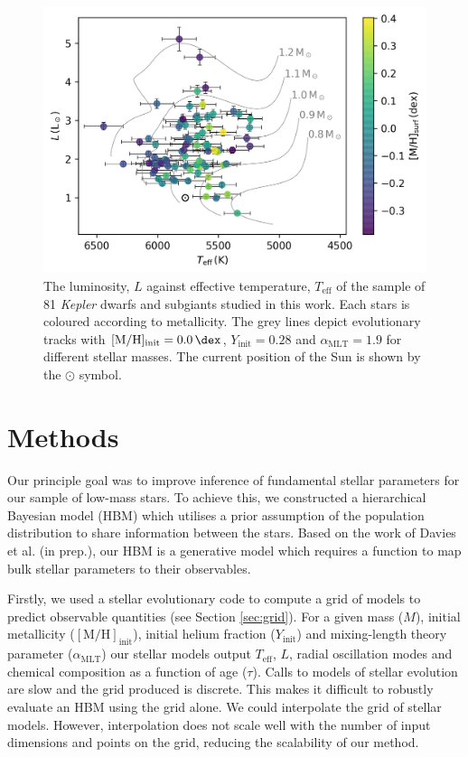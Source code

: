 \documentclass[a4paper,fleqn,usenatbib]{mnras}
\newcommand{\metallicity}{\ensuremath{[\mathrm{M}/\mathrm{H}]}}
\newcommand{\teff}{\ensuremath{T_\mathrm{eff}}}
\newcommand{\mlt}{\ensuremath{{\alpha_\mathrm{MLT}}}}
\begin{document}
\begin{figure}
    \centering
    \includegraphics[width=\linewidth]{figures/context.png}
    \caption{The luminosity, $L$ against effective temperature, $\teff$ of the sample of 81 \emph{Kepler} dwarfs and subgiants studied in this work. Each stars is coloured according to metallicity. The grey lines depict evolutionary tracks with $\metallicity_\mathrm{init}=\SI{0.0}{\dex}$, $Y_\mathrm{init}=0.28$ and $\mlt=1.9$ for different stellar masses. The current position of the Sun is shown by the $\odot$ symbol.}
    \label{fig:data}
\end{figure}

\section{Methods}\label{sec:meth}

Our principle goal was to improve inference of fundamental stellar parameters for our sample of low-mass stars. To achieve this, we constructed a hierarchical Bayesian model (HBM) which utilises a prior assumption of the population distribution to share information between the stars. Based on the work of Davies et al. (in prep.), our HBM is a generative model which requires a function to map bulk stellar parameters to their observables.

Firstly, we used a stellar evolutionary code to compute a grid of models to predict observable quantities (see Section \ref{sec:grid}). For a given mass ($M$), initial metallicity ($\metallicity_\mathrm{init}$), initial helium fraction ($Y_\mathrm{init}$) and mixing-length theory parameter ($\mlt$) our stellar models output $\teff$, $L$, radial oscillation modes and chemical composition as a function of age ($\tau$). Calls to models of stellar evolution are slow and the grid produced is discrete. This makes it difficult to robustly evaluate an HBM using the grid alone. We could interpolate the grid of stellar models. However, interpolation does not scale well with the number of input dimensions and points on the grid, reducing the scalability of our method.
\end{document}
